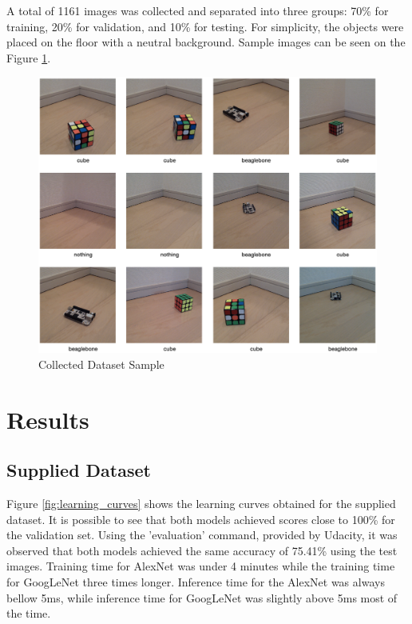 \documentclass[10pt,journal,compsoc]{IEEEtran}
\begin{document}
A total of 1161 images was collected and separated into three groups: 70\% for training, 20\% for validation, and 10\% for testing. For simplicity, the objects were placed on the floor with a neutral background. Sample images can be seen on the Figure \ref{fig:collected_sample}.
\begin{figure}[thpb]
      \centering
      \includegraphics[width=\linewidth]{o_dataset_sample.png}
      \caption{Collected Dataset Sample}
      \label{fig:collected_sample}
\end{figure}



\section{Results}

\subsection{Supplied Dataset}

Figure \ref{fig:learning_curves} shows the learning curves obtained for the supplied dataset. It is possible to see that both models achieved scores close to 100\% for the validation set.
Using the 'evaluation' command, provided by Udacity, it was observed that both models achieved the same accuracy of 75.41\% using the test images. Training time for AlexNet was under 4 minutes while the training time for GoogLeNet three times longer. Inference time for the AlexNet was always bellow 5ms, while inference time for GoogLeNet was slightly above 5ms most of the time. 
\end{document}
